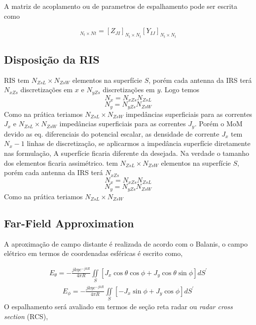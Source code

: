 \documentclass[
	12pt,				%
	openright,			%
	oneside,			%
	a4paper,			%
	english,			%
	brazil				%
	]{abntex2}
\begin{document}
 A matriz de acoplamento ou de parametros de espalhamento pode ser escrita como

\begin{equation}
  [S_{JJ}]_{N_t \times Nt}= [Z_{JI}]_{N_t \times N_t} [Y_{IJ}]_{N_t \times N_t}
\end{equation}



 \subsection{Disposição da RIS}
RIS tem $N_{ZsL} \times N_{ZsW}$ elementos na superfície $S$, porém cada antenna da IRS terá $N_{xZs}$ discretizações em $x$ e $N_{yZs}$ discretizações em $y$.  Logo temos
\begin{equation}
    N_{x}=N_{xZs}N_{ZsL}
\end{equation}
\begin{equation}
    N_{y}=N_{yZs}N_{ZsW}
\end{equation}
 Como na prática teriamos $N_{ZsL} \times N_{ZsW}$ impedâncias superficiais para as correntes $J_x$ e  $N_{ZsL} \times N_{ZsW}$ impedâncias superficiais para as correntes $J_y$.
Porém o MoM devido as eq. diferenciais do potencial escalar, as densidade de corrente $J_x$ tem $N_{x}-1$ linhas de discretização, se aplicarmos a impedância superfície diretamente nas formulação, A superfície ficaria diferente da desejada. Na verdade o tamanho dos elementos ficaria assimétrico.
 tem $N_{ZsL} \times N_{ZsW}$ elementos na superfície $S$, porém cada antenna da IRS terá $N_{xZs}$
\begin{equation}
    N_{x}=N_{xZs}N_{ZsL}
\end{equation}
\begin{equation}
    N_{y}=N_{yZs}N_{ZsW}
\end{equation}
 Como na prática teriamos $N_{ZsL} \times N_{ZsW}$  
 
\subsection{Far-Field Approximation}



A aproximação de campo distante é realizada de acordo com o Balanis, o campo elétrico em termos de coordenadas esféricas é escrito como,

 \begin{equation}
\begin{aligned}
E_{\theta}=-\frac{jk \eta e^{-j kR}}{4\pi R} 
  \iint \limits_S [J_x \cos{\theta} \cos{\phi}+J_y \cos{\theta} \sin{\phi}] dS^{'}
   \end{aligned}
\end{equation}
 \begin{equation}
\begin{aligned}
E_{\phi}=-\frac{jk\eta e^{-jkR}}{4\pi R} 
  \iint \limits_S [-J_x  \sin{\phi} +J_y \cos{\phi} ] dS^{'}
   \end{aligned}
\end{equation}
O espalhamento será avaliado em termos de seção reta radar ou \emph{radar cross section} (RCS), 
\end{document}
